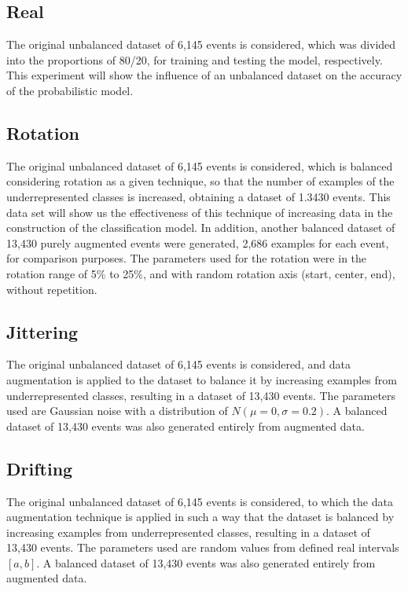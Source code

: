 \documentclass[journal]{IEEEtran}
\begin{document}
\subsection{Real}
The original unbalanced dataset of 6,145 events is considered, which was divided into the proportions of 80/20, for training and testing the model, respectively. This experiment will show the influence of an unbalanced dataset on the accuracy of the probabilistic model.
\subsection{Rotation}
The original unbalanced dataset of 6,145 events is considered, which is balanced considering rotation as a given technique, so that the number of examples of the underrepresented classes is increased, obtaining a dataset of 1.3430 events. This data set will show us the effectiveness of this technique of increasing data in the construction of the classification model.
In addition, another balanced dataset of 13,430 purely augmented events were generated, 2,686 examples for each event, for comparison purposes.
The parameters used for the rotation were in the rotation range of 5\% to 25\%, and with random rotation axis (start, center, end), without repetition.
\subsection{Jittering}
The original unbalanced dataset of 6,145 events is considered, and data augmentation is applied to the dataset to balance it by increasing examples from underrepresented classes, resulting in a dataset of 13,430 events.
The parameters used are Gaussian noise with a distribution of $N(\mu=0,\sigma=0.2)$. A balanced dataset of 13,430 events was also generated entirely from augmented data.
\subsection{Drifting}
The original unbalanced dataset of 6,145 events is considered, to which the data augmentation technique is applied in such a way that the dataset is balanced by increasing examples from underrepresented classes, resulting in a dataset of 13,430 events.
The parameters used are random values from defined real intervals $[a,b]$. A balanced dataset of 13,430 events was also generated entirely from augmented data.
\end{document}
